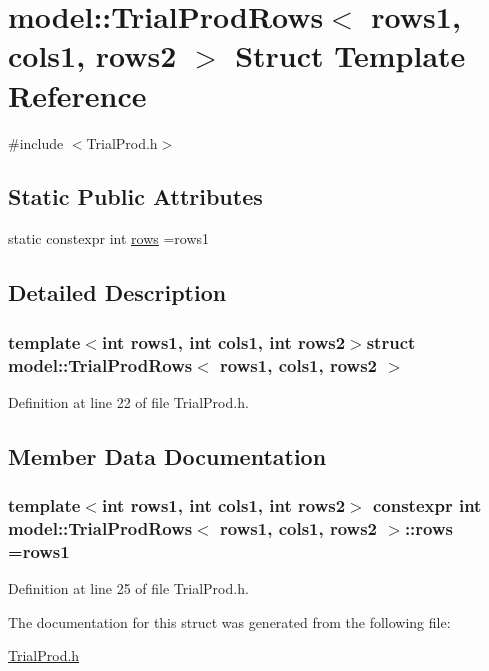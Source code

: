 \hypertarget{structmodel_1_1_trial_prod_rows}{}\section{model\+:\+:Trial\+Prod\+Rows$<$ rows1, cols1, rows2 $>$ Struct Template Reference}
\label{structmodel_1_1_trial_prod_rows}


{\ttfamily \#include $<$Trial\+Prod.\+h$>$}

\subsection*{Static Public Attributes}
\begin{DoxyCompactItemize}
\item 
static constexpr int \hyperlink{structmodel_1_1_trial_prod_rows_a8904e334da1b105a4d73a25e67103e61}{rows} =rows1
\end{DoxyCompactItemize}


\subsection{Detailed Description}
\subsubsection*{template$<$int rows1, int cols1, int rows2$>$struct model\+::\+Trial\+Prod\+Rows$<$ rows1, cols1, rows2 $>$}



Definition at line 22 of file Trial\+Prod.\+h.



\subsection{Member Data Documentation}
\hypertarget{structmodel_1_1_trial_prod_rows_a8904e334da1b105a4d73a25e67103e61}{}
\subsubsection[{rows}]{\setlength{\rightskip}{0pt plus 5cm}template$<$int rows1, int cols1, int rows2$>$ constexpr int {\bf model\+::\+Trial\+Prod\+Rows}$<$ rows1, cols1, rows2 $>$\+::rows =rows1\hspace{0.3cm}{\ttfamily [static]}}\label{structmodel_1_1_trial_prod_rows_a8904e334da1b105a4d73a25e67103e61}


Definition at line 25 of file Trial\+Prod.\+h.



The documentation for this struct was generated from the following file\+:\begin{DoxyCompactItemize}
\item 
\hyperlink{_trial_prod_8h}{Trial\+Prod.\+h}\end{DoxyCompactItemize}

